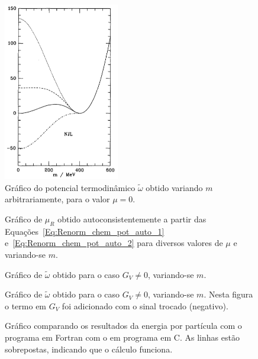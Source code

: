 \begin{figure}
	\centering
	\includegraphics[width=0.45\textwidth]{graphics/Therm_pot_analysis/Pot_buballa.png}
	\caption{Gráfico do potencial termodinâmico $\tilde{\omega}$ obtido variando $m$ arbitrariamente, para o valor $\mu = 0$.}
	\label{Fig:pot_term_analysys_Buballa_NJL-Buballa_Set_1}
\end{figure}

\begin{figure}
	
	\caption{Gráfico de $\mu_R$ obtido autoconsistentemente a partir das Equações~\eqref{Eq:Renorm_chem_pot_auto_1} e~\eqref{Eq:Renorm_chem_pot_auto_2} para diversos valores de $\mu$ e variando-se $m$. \protect}
	\label{Fig:Renorm_chem_pot}
\end{figure}

\begin{figure}
	
	\caption{Gráfico de $\tilde\omega$ obtido para o caso $G_V \neq 0$, variando-se $m$. \protect}
	\label{Fig:Fig2.8RBubR_repro}
\end{figure}

\begin{figure}
	
	\caption{Gráfico de $\tilde\omega$ obtido para o caso $G_V \neq 0$, variando-se $m$. Nesta figura o termo em $G_V$ foi adicionado com o sinal trocado (negativo). \protect}
	\label{Fig:Fig2.8RBubR_repro_s}
\end{figure}

\begin{figure}
	
	\caption{Gráfico comparando os resultados da energia por partícula com o programa em Fortran com o em programa em C. As linhas estão sobrepostas, indicando que o cálculo funciona. \protect}
	\label{Fig:energy_Comp_C_F}
\end{figure}

